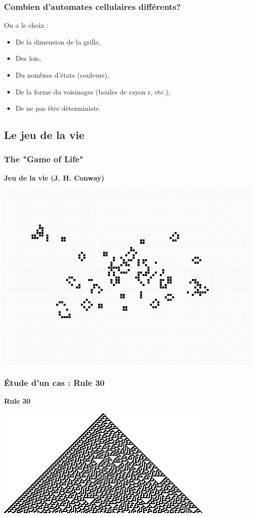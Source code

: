 \documentclass{beamer}
\begin{document}
\begin{frame}
\frametitle{Combien d'automates cellulaires différents?}
\begin{block}{On a le choix :}
	\begin{itemize}
	\item De la dimension de la grille,
	\item Des lois,
	\item Du nombres d'états (couleurs),
	\item De la forme du voisinages (boules de rayon r, etc.),
	\item De ne pas être déterministe.
	\end{itemize}
\end{block}
\end{frame}

\subsection{Le jeu de la vie}
\begin{frame}
\frametitle{The "Game of Life"}
\begin{center}
\bf{Jeu de la vie} (J. H. Conway)
\end{center}
\begin{center}
\includegraphics[scale=0.5]{game_of_life.png}
\end{center}
\end{frame}

\begin{frame}
\frametitle{Étude d'un cas : Rule 30}
\begin{center}
\textbf{Rule 30}
\end{center}
\begin{center}
\includegraphics[scale=1]{rule30.png}
\end{center}
\end{frame}
\end{document}
